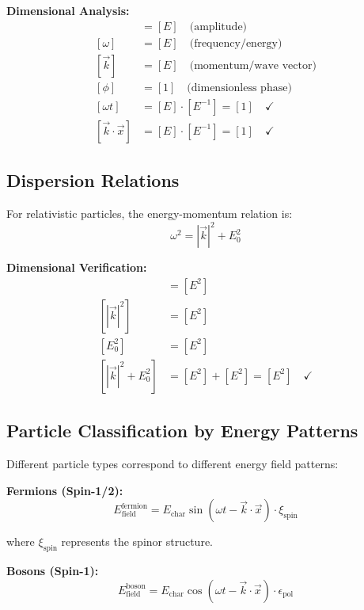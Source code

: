 \documentclass[12pt,a4paper]{report}
\begin{document}
	\textbf{Dimensional Analysis:}
	\begin{align}
		[E_0] &= [E] \quad \text{(amplitude)} \\
		[\omega] &= [E] \quad \text{(frequency/energy)} \\
		[\vec{k}] &= [E] \quad \text{(momentum/wave vector)} \\
		[\phi] &= [1] \quad \text{(dimensionless phase)} \\
		[\omega t] &= [E] \cdot [E^{-1}] = [1] \quad \checkmark \\
		[\vec{k} \cdot \vec{x}] &= [E] \cdot [E^{-1}] = [1] \quad \checkmark
	\end{align}
	
	\subsection{Dispersion Relations}
	
	For relativistic particles, the energy-momentum relation is:
	\begin{equation}
		\omega^2 = |\vec{k}|^2 + E_0^2
	\end{equation}
	
	\textbf{Dimensional Verification:}
	\begin{align}
		[\omega^2] &= [E^2] \\
		[|\vec{k}|^2] &= [E^2] \\
		[E_0^2] &= [E^2] \\
		[|\vec{k}|^2 + E_0^2] &= [E^2] + [E^2] = [E^2] \quad \checkmark
	\end{align}
	
	\subsection{Particle Classification by Energy Patterns}
	\label{subsec:energy_patterns}
	
	Different particle types correspond to different energy field patterns:
	
	\textbf{Fermions (Spin-1/2):}
	\begin{equation}
		E_{\text{field}}^{\text{fermion}} = E_{\text{char}} \sin(\omega t - \vec{k} \cdot \vec{x}) \cdot \xi_{\text{spin}}
	\end{equation}
	
	where $\xi_{\text{spin}}$ represents the spinor structure.
	
	\textbf{Bosons (Spin-1):}
	\begin{equation}
		E_{\text{field}}^{\text{boson}} = E_{\text{char}} \cos(\omega t - \vec{k} \cdot \vec{x}) \cdot \epsilon_{\text{pol}}
	\end{equation}
	
\end{document}
